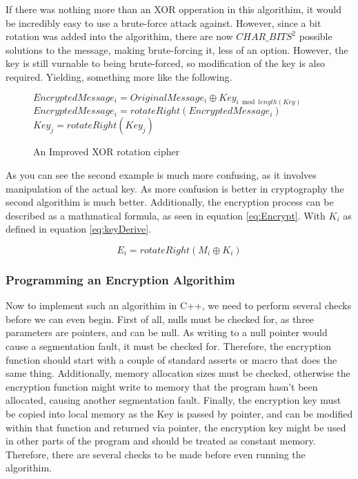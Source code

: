 \documentclass[12pt]{article}
\begin{document}
    If there was nothing more than an XOR opperation in this algorithim,
    it would be incredibly easy to use a brute-force attack against.
    However, since a bit rotation was added into the algorithim, there
    are now \(CHAR\_BITS^2\) possible solutions to the message, making
    brute-forcing it, less of an option. However, the key is still
    vurnable to being brute-forced, so modification of the key is also
    required. Yielding, something more like the following.
    
    \begin{figure}[h]
    \begin{algorithmic}[1]
    \label{fig:ImprovRotCiph}
      \State $EncryptedMessage_i =
             OriginalMessage_i \oplus Key_{i \bmod length(Key)}$
      \State $EncryptedMessage_i = rotateRight(EncryptedMessage_i)$
          \State $Key_j = rotateRight(Key_j)$
        \EndFor
      \EndIf
    \EndFor
    \end{algorithmic}
    \caption{An Improved XOR rotation cipher}
    \end{figure}
    
    As you can see the second example is much more confusing, as it 
    involves manipulation of the actual key. As more confusion is 
    better in cryptography the second algorithim is much better.
    Additionally, the encryption process can be described as a
    mathmatical formula, as seen in equation \eqref{eq:Encrypt}. 
    With \(K_i\) as defined in equation \eqref{eq:keyDerive}.
    
    \begin{equation}
      \label{eq:Encrypt}
      E_{i} = rotateRight(M_{i} \oplus K_{i})   
    \end{equation}

    \subsubsection{Programming an Encryption Algorithim}
    Now to implement such an algorithim in C++, we need to perform several
    checks before we can even begin. First of all, nulls must be
    checked for, as three parameters are pointers, and can be null.
    As writing to a null pointer would cause a segmentation fault, 
    it must be checked for. Therefore, the encryption function should 
    start with a couple of standard asserts or macro that does the same
    thing. Additionally, memory allocation sizes must be checked,
    otherwise the encryption function might write to
    memory that the program hasn't  been allocated, causing another
    segmentation fault. Finally, the encryption key must be copied into
    local memory as the Key is passed by pointer, and can be modified
    within that function and returned via pointer, the encryption key
    might be used in other parts of the program and should be treated
    as constant memory. Therefore, there are several checks to be made
    before even running the algorithim.
    
\end{document}

